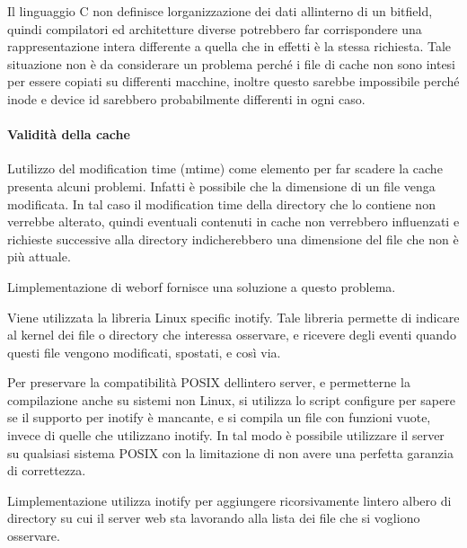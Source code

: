 \documentclass[a4paper,11pt]{article}
\begin{document}
{\sffamily
Il linguaggio C non definisce l{\textquotesingle}organizzazione dei dati
all{\textquotesingle}interno di un bitfield\cite{COMP07}, quindi compilatori
ed architetture diverse potrebbero far corrispondere una
rappresentazione intera differente a quella che in effetti \`e la
stessa richiesta. Tale situazione non \`e da considerare un problema
perch\'e i file di cache non sono intesi per essere copiati su
differenti macchine, inoltre questo sarebbe impossibile perch\'e inode
e device id sarebbero probabilmente differenti in ogni caso.}


\bigskip

\paragraph[Validit\`a della cache]{Validit\`a della cache}
{\sffamily
L{\textquotesingle}utilizzo del modification time (mtime) come elemento
per far scadere la cache presenta alcuni problemi. Infatti \`e
possibile che la dimensione di un file venga modificata. In tal caso il
modification time della directory che lo contiene non verrebbe
alterato, quindi eventuali contenuti in cache non verrebbero
influenzati e richieste successive alla directory indicherebbero una
dimensione del file che non \`e pi\`u attuale.}


\bigskip

{\sffamily
L{\textquotesingle}implementazione di weborf fornisce una soluzione a
questo problema.}


\bigskip

{\sffamily
Viene utilizzata la libreria Linux specific inotify. Tale libreria
permette di indicare al kernel dei file o directory che interessa
osservare, e ricevere degli eventi quando questi file vengono
modificati, spostati, e cos\`i via.}

{\sffamily
Per preservare la compatibilit\`a POSIX dell{\textquotesingle}intero
server, e permetterne la compilazione anche su sistemi non Linux, si
utilizza lo script configure per sapere se il supporto per inotify \`e
mancante, e si compila un file con funzioni vuote, invece di quelle che
utilizzano inotify. In tal modo \`e possibile utilizzare il server su
qualsiasi sistema POSIX con la limitazione di non avere una perfetta
garanzia di correttezza.}


\bigskip

{\sffamily
L{\textquotesingle}implementazione utilizza inotify per aggiungere
ricorsivamente l{\textquotesingle}intero albero di directory su cui il
server web sta lavorando alla lista dei file che si vogliono
osservare.}
\end{document}

